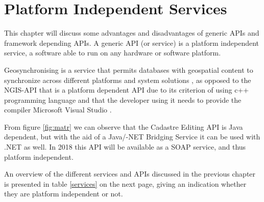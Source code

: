 

\chapter{Platform Independent Services}

This chapter will discuss some advantages and disadvantages of generic APIs and framework depending APIs. A generic API (or service) is a platform independent service, a software able to run on any hardware or software platform.

Geosynchronising is a service that permits databases with geospatial content to synchronize across different platforms and system solutions \citep{Kartverket2013}, as opposed to the NGIS-API that is a platform dependent API due to its criterion of using c++ programming language and that the developer using it needs to provide the compiler Microsoft Visual Studio \citep{Kartverket2017b, Norkart2011}.

From figure \ref{fig:matr} we can observe that the Cadastre Editing API is Java dependent, but with the aid of a Java/-NET Bridging Service it can be used with .NET as well. In 2018 this API will be available as a SOAP service, and thus platform independent. 

An overview of the different services and APIs discussed in the previous chapter is presented in table \ref{services} on the next page, giving an indication whether they are platform independent or not.

